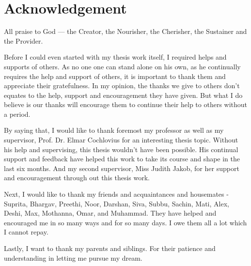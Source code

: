 \chapter{Acknowledgement}

All praise to God --- the Creator, the Nourisher, the Cherisher, the Sustainer and the Provider.

Before I could even started with my thesis work itself, I required helps and supports of others. As no one one can stand alone on his own, as he continually requires the help and support of others, it is important to thank them and appreciate their gratefulness. In my opinion, the thanks we give to others don't equates to the help, support and encouragement they have given. But what I do believe is our thanks will encourage them to continue their help to others without a period.

By saying that, I would like to thank foremost my professor as well as my supervisor, Prof. Dr. Elmar Cochlovius for an interesting thesis topic. Without his help and supervising, this thesis wouldn't have been possible. His continual support and feedback have helped this work to take its course and shape in the last six months. And my second supervisor, Miss Judith Jakob, for her support and encouragement through out this thesis work.

Next, I would like to thank my friends and acquaintances and housemates - Suprita, Bhargav, Preethi, Noor, Darshan, Siva, Subbu, Sachin, Mati, Alex, Deshi, Max, Mothanna, Omar, and Muhammad. They have helped and encouraged me in so many ways and for so many days. I owe them all a lot which I cannot repay. 

Lastly, I want to thank my parents and siblings. For their patience and understanding in letting me pursue my dream.